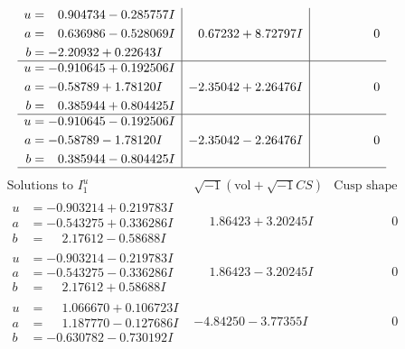 \documentclass[1p]{elsarticle_modified}
\theoremstyle{definition}
\newcommand{\I}{\sqrt{-1}}
\begin{document}
$$\begin{array}{c|c|c}
\begin{aligned}
u &= \phantom{-}0.904734 - 0.285757 I \\
a &= \phantom{-}0.636986 - 0.528069 I \\
b &= -2.20932 + 0.22643 I\end{aligned}
 & \phantom{-}0.67232 + 8.72797 I & \phantom{-0.000000 } 0 \\ \hline\begin{aligned}
u &= -0.910645 + 0.192506 I \\
a &= -0.58789 + 1.78120 I \\
b &= \phantom{-}0.385944 + 0.804425 I\end{aligned}
 & -2.35042 + 2.26476 I & \phantom{-0.000000 } 0 \\ \hline\begin{aligned}
u &= -0.910645 - 0.192506 I \\
a &= -0.58789 - 1.78120 I \\
b &= \phantom{-}0.385944 - 0.804425 I\end{aligned}
 & -2.35042 - 2.26476 I & \phantom{-0.000000 } 0\\
 \hline 
 \end{array}$$\newpage$$\begin{array}{c|c|c}  
\text{Solutions to }I^u_{1}& \I (\text{vol} + \sqrt{-1}CS) & \text{Cusp shape}\\
 \hline 
\begin{aligned}
u &= -0.903214 + 0.219783 I \\
a &= -0.543275 + 0.336286 I \\
b &= \phantom{-}2.17612 - 0.58688 I\end{aligned}
 & \phantom{-}1.86423 + 3.20245 I & \phantom{-0.000000 } 0 \\ \hline\begin{aligned}
u &= -0.903214 - 0.219783 I \\
a &= -0.543275 - 0.336286 I \\
b &= \phantom{-}2.17612 + 0.58688 I\end{aligned}
 & \phantom{-}1.86423 - 3.20245 I & \phantom{-0.000000 } 0 \\ \hline\begin{aligned}
u &= \phantom{-}1.066670 + 0.106723 I \\
a &= \phantom{-}1.187770 - 0.127686 I \\
b &= -0.630782 - 0.730192 I\end{aligned}
 & -4.84250 - 3.77355 I & \phantom{-0.000000 } 0 \\ \hline\begin{aligned}

\end{aligned}
\end{array}$$
\end{document}
